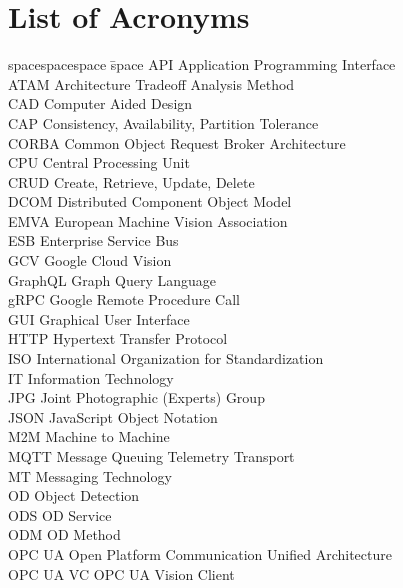 \chapter*{List of Acronyms}
\begin{tabbing}
spacespacespace \= space \kill
API	 \> 	Application Programming Interface	 \\
ATAM	 \> 	Architecture Tradeoff Analysis Method	 \\
CAD	 \> 	Computer Aided Design	 \\
CAP	 \> 	Consistency, Availability, Partition Tolerance	 \\
CORBA	 \> 	Common Object Request Broker Architecture 	 \\
CPU	 \> 	Central Processing Unit	 \\
CRUD	 \> 	Create, Retrieve, Update, Delete	 \\
DCOM	 \> 	Distributed Component Object Model	 \\
EMVA \> European Machine Vision Association\\
ESB	\>	Enterprise Service Bus \\
GCV	\>	Google Cloud Vision \\
GraphQL     \>  Graph Query Language\\
gRPC     \>  Google Remote Procedure Call\\
GUI	\>	Graphical User Interface \\
HTTP	 \> 	Hypertext Transfer Protocol	 \\
ISO    \>  International Organization for Standardization\\
IT  \>  Information Technology\\
JPG	\>	Joint Photographic (Experts) Group \\
JSON	\>	JavaScript Object Notation \\
M2M	\>	Machine to Machine \\
MQTT     \>  Message Queuing Telemetry Transport\\
MT      \> Messaging Technology\\
OD     \>  Object Detection\\
ODS     \>  OD Service\\
ODM     \>  OD Method\\
OPC UA     \>  Open Platform Communication Unified Architecture\\
OPC UA VC    \>  OPC UA Vision Client\\

\end{tabbing}
